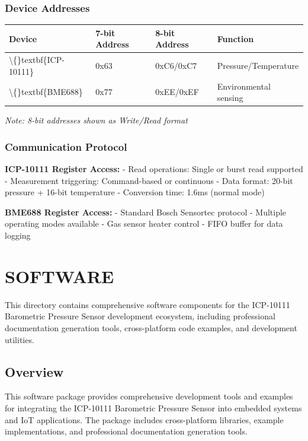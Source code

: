 \documentclass[11pt,a4paper]{article}
\begin{document}
\subsubsection{Device Addresses}

\begin{table}[H]
\centering
\begin{tabular}{llll}
\toprule
Device & 7-bit Address & 8-bit Address & Function \\
\midrule
\textbackslash\{\}textbf\{ICP-10111\} & 0x63 & 0xC6/0xC7 & Pressure/Temperature \\
\textbackslash\{\}textbf\{BME688\} & 0x77 & 0xEE/0xEF & Environmental sensing \\
\bottomrule
\end{tabular}
\end{table}


\textit{Note: 8-bit addresses shown as Write/Read format}

\subsubsection{Communication Protocol}

\textbf{ICP-10111 Register Access:}
- Read operations: Single or burst read supported
- Measurement triggering: Command-based or continuous
- Data format: 20-bit pressure + 16-bit temperature
- Conversion time: 1.6ms (normal mode)

\textbf{BME688 Register Access:}
- Standard Bosch Sensortec protocol
- Multiple operating modes available
- Gas sensor heater control
- FIFO buffer for data logging




\setcounter{section}{0}
\section{SOFTWARE}



This directory contains comprehensive software components for the ICP-10111 Barometric Pressure Sensor development ecosystem, including professional documentation generation tools, cross-platform code examples, and development utilities.

\subsection{Overview}

This software package provides comprehensive development tools and examples for integrating the ICP-10111 Barometric Pressure Sensor into embedded systems and IoT applications. The package includes cross-platform libraries, example implementations, and professional documentation generation tools.
\end{document}
